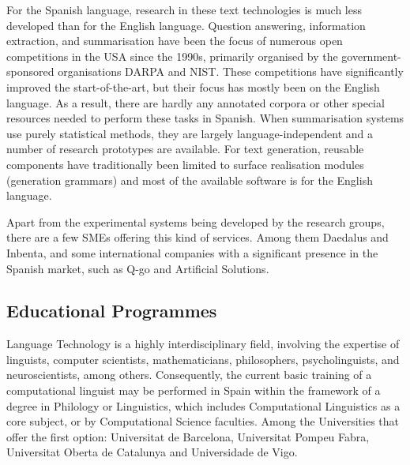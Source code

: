 \begin{multicols}{2}

For the Spanish language, research in these text technologies is much less developed than for the English language. Question answering, information extraction, and summarisation have been the focus of numerous open competitions in the USA since the 1990s, primarily organised by the government-sponsored organisations DARPA and NIST. These competitions have significantly improved the start-of-the-art, but their focus has mostly been on the English language. As a result, there are hardly any annotated corpora or other special resources needed to perform these tasks in Spanish. When summarisation systems use purely statistical methods, they are largely language-independent and a number of research prototypes are available. For text generation, reusable components have traditionally been limited to surface realisation modules (generation grammars) and most of the available software is for the English language.

Apart from the experimental systems being developed by the research groups, there are a few SMEs offering this kind of services. Among them Daedalus and Inbenta, and some international companies with a significant presence in the Spanish market, such as Q-go  and Artificial Solutions.

\subsection{Educational Programmes}

Language Technology is a highly interdisciplinary field, involving the expertise of linguists, computer scientists, mathematicians, philosophers, psycholinguists, and neuroscientists, among others. Consequently, the current basic training of a computational linguist may be performed in Spain within the framework of a degree in Philology or Linguistics, which includes Computational Linguistics as a core subject, or by Computational Science faculties. Among the Universities that offer the first option: Universitat de Barcelona, Universitat Pompeu Fabra, Universitat Oberta de Catalunya and Universidade de Vigo. 



\end{multicols}
